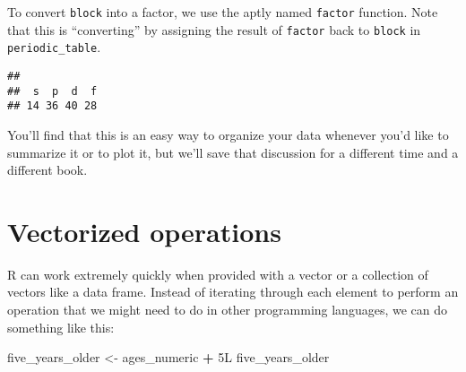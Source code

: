 \documentclass[]{tufte-book}
\newenvironment{Shaded}{\begin{snugshade}}{\end{snugshade}}
\newcommand{\DataTypeTok}[1]{\textcolor[rgb]{0.13,0.29,0.53}{#1}}
\newcommand{\KeywordTok}[1]{\textcolor[rgb]{0.13,0.29,0.53}{\textbf{#1}}}
\newcommand{\NormalTok}[1]{#1}
\newcommand{\OperatorTok}[1]{\textcolor[rgb]{0.81,0.36,0.00}{\textbf{#1}}}
\newcommand{\StringTok}[1]{\textcolor[rgb]{0.31,0.60,0.02}{#1}}
\begin{document}
To convert \texttt{block} into a factor, we use the aptly named \texttt{factor} function. Note that this is ``converting'' by assigning the result of \texttt{factor} back to \texttt{block} in \texttt{periodic\_table}.

\begin{Shaded}
\end{Shaded}

\begin{Shaded}
\end{Shaded}

\begin{verbatim}
## 
##  s  p  d  f 
## 14 36 40 28
\end{verbatim}

You'll find that this is an easy way to organize your data whenever you'd like to summarize it or to plot it, but we'll save that discussion for a different time and a different book.

\hypertarget{vectorized-operations}{%
\section{Vectorized operations}\label{vectorized-operations}}

R can work extremely quickly when provided with a vector or a collection of vectors like a data frame. Instead of iterating through each element to perform an operation that we might need to do in other programming languages, we can do something like this:

\begin{Shaded}
\begin{Highlighting}[]
\NormalTok{five\_years\_older <{-}}\StringTok{ }\NormalTok{ages\_numeric }\OperatorTok{+}\StringTok{ }\NormalTok{5L}
\NormalTok{five\_years\_older}
\end{Highlighting}
\end{Shaded}
\end{document}
